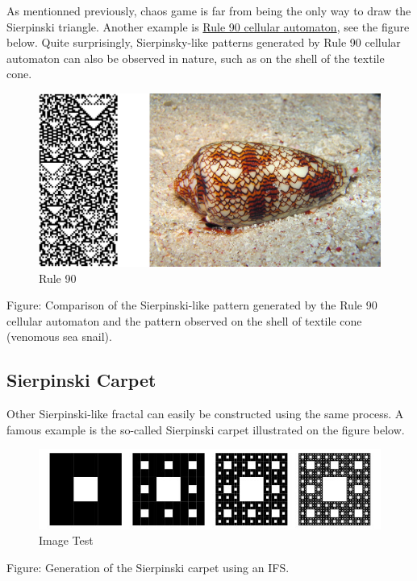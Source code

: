 \documentclass[11pt]{article}
\makeatletter
\def\maxwidth{\ifdim\Gin@nat@width>\linewidth\linewidth
    \else\Gin@nat@width\fi}
\let\Oldincludegraphics\includegraphics
\renewcommand{\includegraphics}[1]{\Oldincludegraphics[width=.8\maxwidth]{#1}}
\makeatother
\begin{document}
As mentionned previously, chaos game is far from being the only way to
draw the Sierpinski triangle. Another example is
\href{https://en.wikipedia.org/wiki/Rule_90}{Rule 90 cellular
automaton}, see the figure below. Quite surprisingly, Sierpinsky-like
patterns generated by Rule 90 cellular automaton can also be observed in
nature, such as on the shell of the textile cone.

\begin{figure}
\centering
\includegraphics{ex_rule90.png}
\caption{Rule 90}
\end{figure}

Figure: Comparison of the Sierpinski-like pattern generated by the Rule
90 cellular automaton and the pattern observed on the shell of textile
cone (venomous sea snail).

\hypertarget{sierpinski-carpet}{%
\subsection{Sierpinski Carpet}\label{sierpinski-carpet}}

Other Sierpinski-like fractal can easily be constructed using the same
process. A famous example is the so-called Sierpinski carpet illustrated
on the figure below.

\begin{figure}
\centering
\includegraphics{sierpinski_carpet_github.jpeg}
\caption{Image Test}
\end{figure}

Figure: Generation of the Sierpinski carpet using an IFS.
\end{document}
